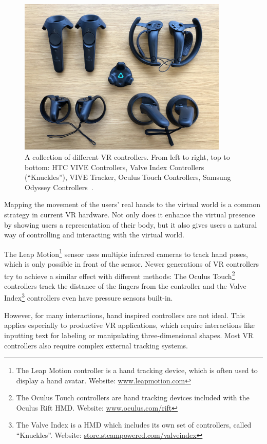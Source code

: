 \begin{figure}[H]%
	\centering%
	\includegraphics[width=10cm]{figures/introduction/vr_controllers.jpg}%
	\caption[Collection of VR controllers]{A collection of different \gls{VR} controllers. From left to right, top to bottom: HTC VIVE Controllers, Valve Index Controllers (\enquote{Knuckles}), VIVE Tracker, Oculus Touch Controllers, Samsung Odyssey Controllers~\cite{Yang.2018}.}\label{fig:vr-controllers}
\end{figure}

Mapping the movement of the users' real hands to the virtual world is a common strategy in current \gls{VR} hardware. Not only does it enhance the virtual presence by showing users a representation of their body, but it also gives users a natural way of controlling and interacting with the virtual world.

The Leap Motion\footnote{The Leap Motion controller is a hand tracking device, which is often used to display a hand avatar. Website: \href{https://www.leapmotion.com/}{www.leapmotion.com}} sensor uses multiple infrared cameras to track hand poses, which is only possible in front of the sensor. Newer generations of \gls{VR} controllers try to achieve a similar effect with different methods: The Oculus Touch\footnote{The Oculus Touch controllers are hand tracking devices included with the Oculus Rift \gls{HMD}. Website: \href{https://www.oculus.com/rift/}{www.oculus.com/rift}} controllers track the distance of the fingers from the controller and the Valve Index\footnote{The Valve Index is a \gls{HMD} which includes its own set of controllers, called \enquote{Knuckles}. Website: \href{https://store.steampowered.com/valveindex}{store.steampowered.com/valveindex}} controllers even have pressure sensors built-in.

However, for many interactions, hand inspired controllers are not ideal. This applies especially to productive \gls{VR} applications, which require interactions like inputting text for labeling or manipulating three-dimensional shapes. Most \gls{VR} controllers also require complex external tracking systems. %


